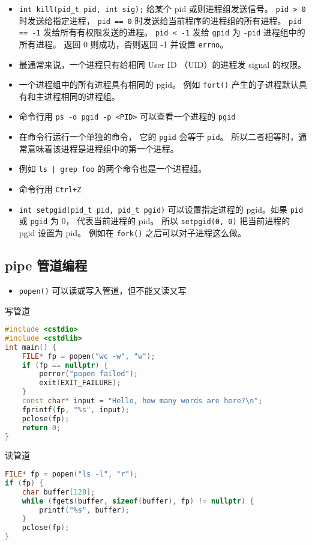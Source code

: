 \begin{itemize}
\item \verb`int kill(pid_t pid, int sig);` 给某个 pid 或则进程组发送信号。 \verb`pid > 0` 时发送给指定进程， \verb`pid == 0` 时发送给当前程序的进程组的所有进程。 \verb`pid == -1` 发给所有有权限发送的进程。 \verb`pid < -1` 发给 \verb`gpid` 为 \verb`-pid` 进程组中的所有进程。 返回 0 则成功，否则返回 -1 并设置 \verb`errno`。
\item 最通常来说，一个进程只有给相同 User ID （UID）的进程发 signal 的权限。
\item 一个进程组中的所有进程具有相同的 pgid。 例如 \verb`fort()` 产生的子进程默认具有和主进程相同的进程组。
\item 命令行用 \verb`ps -o pgid -p <PID>` 可以查看一个进程的 \verb`pgid`
\item 在命令行运行一个单独的命令， 它的 \verb`pgid` 会等于 \verb`pid`。 所以二者相等时，通常意味着该进程是进程组中的第一个进程。
\item 例如 \verb`ls | grep foo` 的两个命令也是一个进程组。
\item 命令行用 \verb`Ctrl+Z`
\item \verb`int setpgid(pid_t pid, pid_t pgid)` 可以设置指定进程的 pgid。如果 \verb`pid` 或 \verb`pgid` 为 0， 代表当前进程的 pid。 所以 \verb`setpgid(0, 0)` 把当前进程的 pgid 设置为 pid。 例如在 \verb`fork()` 之后可以对子进程这么做。
\end{itemize}

\subsection{pipe 管道编程}
\begin{itemize}
\item \verb`popen()` 可以读或写入管道，但不能又读又写
\end{itemize}

写管道
\begin{lstlisting}[language=cpp]
#include <cstdio>
#include <cstdlib>
int main() {
    FILE* fp = popen("wc -w", "w");
    if (fp == nullptr) {
        perror("popen failed");
        exit(EXIT_FAILURE);
    }
    const char* input = "Hello, how many words are here?\n";
    fprintf(fp, "%s", input);
    pclose(fp);
    return 0;
}
\end{lstlisting}
读管道
\begin{lstlisting}[language=cpp]
FILE* fp = popen("ls -l", "r");
if (fp) {
    char buffer[128];
    while (fgets(buffer, sizeof(buffer), fp) != nullptr) {
        printf("%s", buffer);
    }
    pclose(fp);
}
\end{lstlisting}

